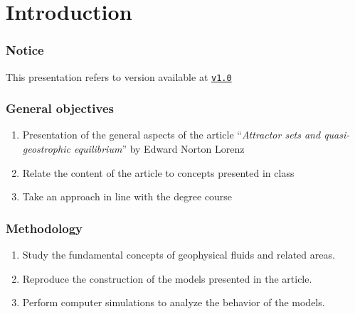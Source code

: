 \section{Introduction} 

\begin{frame}
\frametitle{Notice}
    This presentation refers to version  available at \href{https://github.com/lucasamtaylor01/Lorenz80/releases/tag/lorenz80}{\texttt{v1.0}}
\end{frame}

\begin{frame}
	\frametitle{General objectives}
	\begin{enumerate}
		\item Presentation of the general aspects of the article ``\textit{Attractor sets and quasi-geostrophic equilibrium}'' by Edward Norton Lorenz
		\item Relate the content of the article to concepts presented in class
		\item Take an approach in line with the degree course
	\end{enumerate}
\end{frame}


\begin{frame}
	\frametitle{Methodology}
	\begin{enumerate}
		\item Study the fundamental concepts of geophysical fluids and related areas.
		\item Reproduce the construction of the models presented in the article.
		\item Perform computer simulations to analyze the behavior of the models.
	\end{enumerate}
\end{frame}

